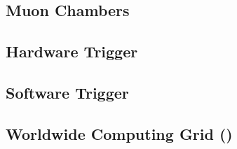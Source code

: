 \subsection{Muon Chambers}

\subsection{Hardware Trigger}

\subsection{Software Trigger}

\subsection{Worldwide \LHC Computing Grid (\WLCG)}


